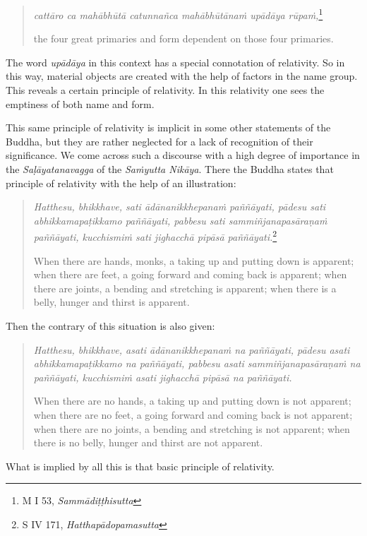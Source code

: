 \begin{quote}
\emph{cattāro ca mahābhūtā catunnañca mahābhūtānaṁ upādāya rūpaṁ,}\footnote{M I 53, \emph{Sammādiṭṭhisutta}}

the four great primaries and form dependent on those four primaries.
\end{quote}

The word \emph{upādāya} in this context has a special connotation of relativity. So in this way, material objects are created with the help of factors in the name group. This reveals a certain principle of relativity. In this relativity one sees the emptiness of both name and form.

This same principle of relativity is implicit in some other statements of the Buddha, but they are rather neglected for a lack of recognition of their significance. We come across such a discourse with a high degree of importance in the \emph{Saḷāyatanavagga} of the \emph{Saṁyutta Nikāya}. There the Buddha states that principle of relativity with the help of an illustration:

\begin{quote}
\emph{Hatthesu, bhikkhave, sati ādānanikkhepanaṁ paññāyati, pādesu sati abhikkamapaṭikkamo paññāyati, pabbesu sati sammiñjanapasāraṇaṁ paññāyati, kucchismiṁ sati jighacchā pipāsā paññāyati.}\footnote{S IV 171, \emph{Hatthapādopamasutta}}

When there are hands, monks, a taking up and putting down is apparent; when there are feet, a going forward and coming back is apparent; when there are joints, a bending and stretching is apparent; when there is a belly, hunger and thirst is apparent.
\end{quote}

Then the contrary of this situation is also given:

\begin{quote}
\emph{Hatthesu, bhikkhave, asati ādānanikkhepanaṁ na paññāyati, pādesu asati abhikkamapaṭikkamo na paññāyati, pabbesu asati sammiñjanapasāraṇaṁ na paññāyati, kucchismiṁ asati jighacchā pipāsā na paññāyati.}

When there are no hands, a taking up and putting down is not apparent; when there are no feet, a going forward and coming back is not apparent; when there are no joints, a bending and stretching is not apparent; when there is no belly, hunger and thirst are not apparent.
\end{quote}

What is implied by all this is that basic principle of relativity.

